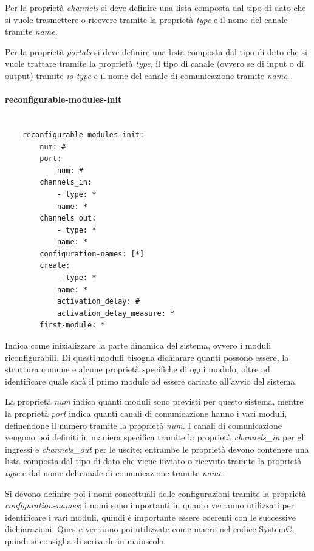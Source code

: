 \documentclass[a4paper,titlepage]{book}
\begin{document}
Per la proprietà \textit{channels} si deve definire una lista composta dal tipo di dato che si vuole trasmettere o ricevere tramite la proprietà \textit{type} e il nome del canale tramite \textit{name}.

Per la proprietà \textit{portals} si deve definire una lista composta dal tipo di dato che si vuole trattare tramite la proprietà \textit{type}, il tipo di canale (ovvero se di input o di output) tramite \textit{io-type} e il nome del canale di comunicazione tramite \textit{name}.

\paragraph{reconfigurable-modules-init}

\begin{lstlisting}[frame=single]

	reconfigurable-modules-init:
		num: #
		port:
			num: #
		channels_in:
			- type: *
			name: *
		channels_out:
			- type: *
			name: *
		configuration-names: [*]
		create:
			- type: *
			name: *
			activation_delay: #
			activation_delay_measure: *
		first-module: *

\end{lstlisting}

Indica come inizializzare la parte dinamica del sistema, ovvero i moduli riconfigurabili. Di questi moduli bisogna dichiarare quanti possono essere, la struttura comune e alcune proprietà specifiche di ogni modulo, oltre ad identificare quale sarà il primo modulo ad essere caricato all'avvio del sistema.

La proprietà \textit{num} indica quanti moduli sono previsti per questo sistema, mentre la proprietà \textit{port} indica quanti canali di comunicazione hanno i vari moduli, definendone il numero tramite la proprietà \textit{num}. I canali di comunicazione vengono poi definiti in maniera specifica tramite la proprietà \textit{channels\_in} per gli ingressi e \textit{channels\_out} per le uscite; entrambe le proprietà devono contenere una lista composta dal tipo di dato che viene inviato o ricevuto tramite la proprietà \textit{type} e dal nome del canale di comunicazione tramite \textit{name}.

 Si devono definire poi i nomi concettuali delle configurazioni tramite la proprietà \textit{configuration-names}; i nomi sono importanti in quanto verranno utilizzati per identificare i vari moduli, quindi è importante essere coerenti con le successive dichiarazioni. Queste verranno poi utilizzate come macro nel codice SystemC, quindi si consiglia di scriverle in maiuscolo.
 
\end{document}
